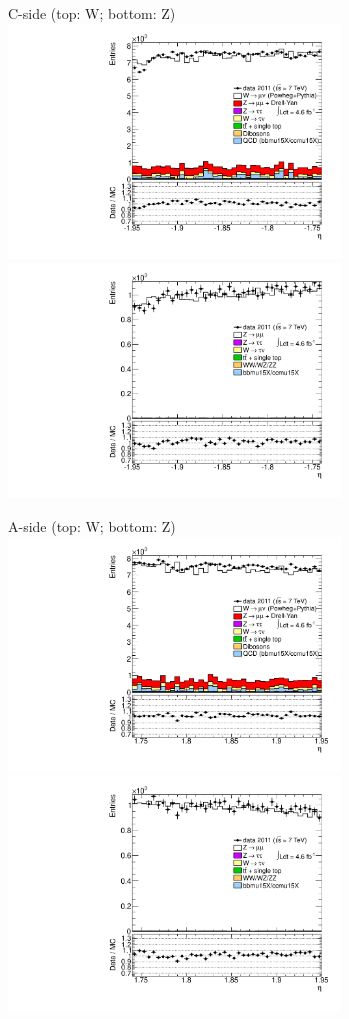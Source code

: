 {

\colb[T]

C-side (top: W; bottom: Z)
\centering
\includegraphics[width=0.66\textwidth]{dates/20130306/figures/etaphi/W_9_C_stack_l_eta_NEG} \\
\includegraphics[width=0.66\textwidth]{dates/20130306/figures/etaphi/Z_9_C_stack_lN_eta_ALL.pdf}

A-side (top: W; bottom: Z)
\centering
\includegraphics[width=0.66\textwidth]{dates/20130306/figures/etaphi/W_9_A_stack_l_eta_NEG} \\
\includegraphics[width=0.66\textwidth]{dates/20130306/figures/etaphi/Z_9_A_stack_lN_eta_ALL.pdf} 

\cole
}


